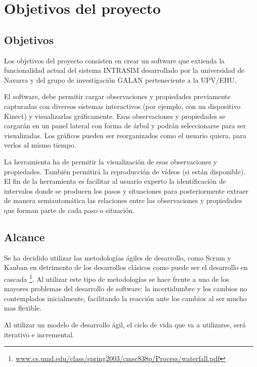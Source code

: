 \chapter{Objetivos del proyecto}


\section{Objetivos}
Los objetivos del proyecto consisten en crear un software que extienda la funcionalidad actual del sistema INTRASIM desarrollado 
por la universidad de Navarra y del grupo de investigación GALAN perteneciente a la UPV/EHU.

El software, debe permitir cargar observaciones y propiedades previamente capturadas con diversos
sistemas interactivos (por ejemplo, con un dispositivo Kinect) y
visualizarlas gr\'aficamente. Esas observaciones y propiedades se cargar\'an en un panel lateral con forma de \'arbol
y podr\'an seleccionarse para ser visualizadas. Los gr\'aficos pueden ser reorganizados como el
usuario quiera, para verlos al mismo tiempo.

La herramienta ha de permitir la visualizaci\'on de esas observaciones y propiedades. 
Tambi\'en permitir\'a la reproducci\'on de v\'ideos (si est\'an disponible).
El fin de la herramienta es
facilitar al usuario experto la identificaci\'on de intervalos donde se producen los
pasos y situaciones para posteriormente extraer de manera semiautom\'atica las relaciones entre las observaciones y
propiedades que forman parte de cada paso o situaci\'on.

\section{Alcance}
Se ha decidido utilizar las metodolog\'ias
\'agiles de desarrollo, como Scrum y Kanban en detrimento de los desarrollos cl\'asicos 
como puede ser el desarrollo en cascada  
\footnote{\url{www.cs.umd.edu/class/spring2003/cmsc838p/Process/waterfall.pdf}}.
Al utilizar este tipo de metodolog\'ias se hace frente a uno de los mayores problemas del 
desarrollo de software: la incertidumbre y los cambios
no contemplados inicialmente, facilitando la reacci\'on ante los cambios
al ser mucho mas flexible.

Al utilizar un modelo de desarrollo \'agil, el ciclo de vida que va a utilizarse, ser\'a iterativo e incremental.

